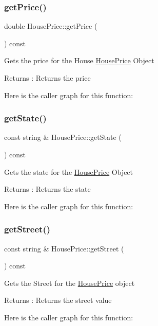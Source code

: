 \subsubsection{\texorpdfstring{get\+Price()}{getPrice()}}
{\footnotesize\ttfamily double House\+Price\+::get\+Price (\begin{DoxyParamCaption}{ }\end{DoxyParamCaption}) const}

Gets the price for the House \hyperlink{class_house_price}{House\+Price} Object \begin{DoxyReturn}{Returns}
\+: Returns the price 
\end{DoxyReturn}
Here is the caller graph for this function\+:
\mbox{\label{class_house_price_a345bc0afd36ca4d9fc67f3dc353a1740}} 
\subsubsection{\texorpdfstring{get\+State()}{getState()}}
{\footnotesize\ttfamily const string \& House\+Price\+::get\+State (\begin{DoxyParamCaption}{ }\end{DoxyParamCaption}) const}

Gets the state for the \hyperlink{class_house_price}{House\+Price} Object \begin{DoxyReturn}{Returns}
\+: Returns the state 
\end{DoxyReturn}
Here is the caller graph for this function\+:
\mbox{\label{class_house_price_a3adb3409680a4abd01d4deed96e39cf9}} 
\subsubsection{\texorpdfstring{get\+Street()}{getStreet()}}
{\footnotesize\ttfamily const string \& House\+Price\+::get\+Street (\begin{DoxyParamCaption}{ }\end{DoxyParamCaption}) const}

Gets the Street for the \hyperlink{class_house_price}{House\+Price} object \begin{DoxyReturn}{Returns}
\+: Returns the street value 
\end{DoxyReturn}
Here is the caller graph for this function\+:
\mbox{\label{class_house_price_ac955167beb435ac335ed5fa72e0e006d}} 
